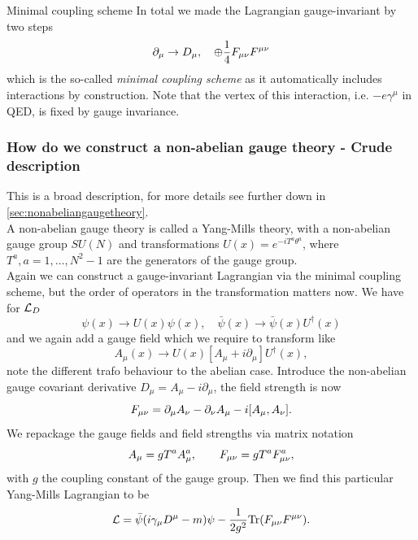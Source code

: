 \begin{mybox}{Minimal coupling scheme}
	In total we made the Lagrangian gauge-invariant by two steps
	\begin{equation}
		\partial_\mu \rightarrow D_\mu,\quad \oplus \frac{1}{4} F_{\mu \nu} F^{\mu \nu}
	\end{equation}
	which is the so-called \emph{minimal coupling scheme} as it automatically includes interactions by construction. Note that the vertex of this interaction, i.e. $-e \gamma^\mu$ in QED, is fixed by gauge invariance.
\end{mybox}
\subsubsection{How do we construct a non-abelian gauge theory - Crude description}
This is a broad description, for more details see further down in \ref{sec:nonabeliangaugetheory}. \\
A non-abelian gauge theory is called a Yang-Mills theory, with a non-abelian gauge group $SU(N)$ and transformations $U(x) = e^{-i T^a \theta^a}$, where $T^a,a=1,\dots,N^2-1$ are the generators of the gauge group.\\
Again we can construct a gauge-invariant Lagrangian via the minimal coupling scheme, but the order of operators in the transformation matters now. We have for $\mathcal{L}_D$
\begin{equation}
	\psi(x) \rightarrow U(x) \psi(x),\quad \bar{ \psi}(x) \rightarrow \bar{ \psi}(x) U^\dagger(x)
\end{equation}
and we again add a gauge field which we require to transform like
\begin{equation}
	A_\mu(x) \rightarrow U(x) \left[ A_\mu + i \partial_\mu\right]U^\dagger(x),
\end{equation}
note the different trafo behaviour to the abelian case. Introduce the non-abelian gauge covariant derivative $D_\mu = A_\mu - i \partial_\mu$, the field strength is now
\begin{equation*}
	F_{\mu \nu} = \partial_\mu A_\nu-\partial_\nu A_\mu - i [A_\mu,A_\nu].
\end{equation*}
We repackage the gauge fields and field strengths via matrix notation
\begin{equation*}
	A_\mu = g T^a A^a_\mu, \qquad F_{\mu \nu}= g T^a F^a_{\mu \nu},
\end{equation*}
with $g$ the coupling constant of the gauge group. Then we find this particular Yang-Mills Lagrangian to be
\begin{equation}
	\mathcal{L} = \bar{ \psi} (i\gamma_\mu D^\mu -m) \psi - \frac{1}{2 g^2} \mathrm{Tr} (F_{\mu \nu} F^{\mu \nu}).
\end{equation}
